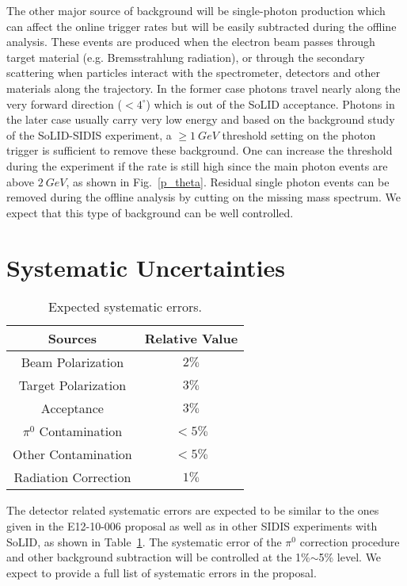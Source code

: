The other major source of background will be single-photon production which can affect the online trigger rates but will be easily subtracted during the offline analysis. These events are produced when the electron beam passes through target material (e.g. Bremsstrahlung radiation), or through the secondary scattering when particles interact with the spectrometer, detectors and other materials along the trajectory. In the former case photons travel nearly along the very forward direction ($<4^{\circ}$) which is out of the SoLID acceptance. Photons in the later case usually carry very low energy and based on the background study of the SoLID-SIDIS experiment, a $\geq 1~GeV$ threshold setting on the photon trigger is sufficient to remove these background. One can increase the threshold during the experiment if the rate is still high since the main photon events are above $2~GeV$, as shown in Fig.~\ref{p_theta}. Residual single photon events can be removed during the offline analysis by cutting on the missing mass spectrum. We expect that this type of background can be well controlled.

\section{Systematic Uncertainties}
\begin{table}[!htp]
\centering
\begin{tabular}{|c|c|}
\hline
{\bf Sources}                  & {\bf Relative Value} \\\hline
Beam Polarization              & $2\%$ \\\hline 
Target Polarization            & $3\%$ \\\hline 
Acceptance                     & $3\%$ \\\hline
$\pi^{0}$ Contamination        & $<5\%$  \\\hline
Other Contamination            & $<5\%$ \\\hline
Radiation Correction           & $1\%$ \\\hline
\end{tabular}
\caption{\footnotesize{Expected systematic errors.}}\label{table:det_sys_err}
\end{table}
The detector related systematic errors are expected to be similar to the ones given in the E12-10-006 proposal as well as in other SIDIS experiments with SoLID, as shown in Table~\ref{table:det_sys_err}. The systematic error of the $\pi^{0}$ correction procedure and other background subtraction will be controlled at the 1\%$\sim$5\% level. %
We expect to provide a full list of systematic errors in the proposal. 
